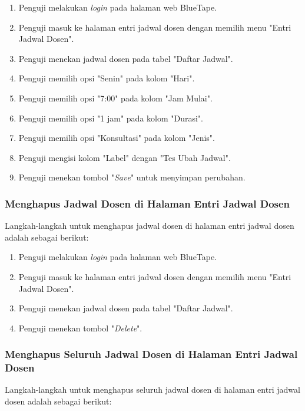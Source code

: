 \begin{enumerate}
    \item Penguji melakukan \textit{login} pada halaman web BlueTape.
    \item Penguji masuk ke halaman entri jadwal dosen dengan memilih menu "Entri Jadwal Dosen".
    \item Penguji menekan jadwal dosen pada tabel "Daftar Jadwal".
    \item Penguji memilih opsi "Senin" pada kolom "Hari".
    \item Penguji memilih opsi "7:00" pada kolom "Jam Mulai".
    \item Penguji memilih opsi "1 jam" pada kolom "Durasi".
    \item Penguji memilih opsi "Konsultasi" pada kolom "Jenis".
    \item Penguji mengisi kolom "Label" dengan "Tes Ubah Jadwal".
    \item Penguji menekan tombol "\textit{Save}" untuk menyimpan perubahan.
\end{enumerate}

\subsubsection{Menghapus Jadwal Dosen di Halaman Entri Jadwal Dosen}
\label{subsubsec:skenario_menghapus_jadwal_dosen_di_halaman_entri_jadwal_dosen}
Langkah-langkah untuk menghapus jadwal dosen di halaman entri jadwal dosen adalah sebagai berikut:

\begin{enumerate}
    \item Penguji melakukan \textit{login} pada halaman web BlueTape.
    \item Penguji masuk ke halaman entri jadwal dosen dengan memilih menu "Entri Jadwal Dosen".
    \item Penguji menekan jadwal dosen pada tabel "Daftar Jadwal".
    \item Penguji menekan tombol "\textit{Delete}".
\end{enumerate}

\subsubsection{Menghapus Seluruh Jadwal Dosen di Halaman Entri Jadwal Dosen}
\label{subsubsec:skenario_menghapus_seluruh_jadwal_dosen_di_halaman_entri_jadwal_dosen}
Langkah-langkah untuk menghapus seluruh jadwal dosen di halaman entri jadwal dosen adalah sebagai berikut:

